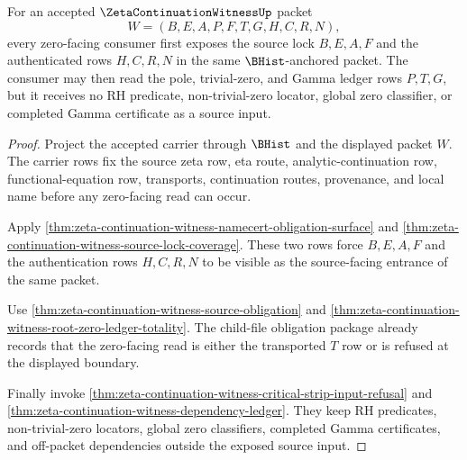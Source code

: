 \begin{theorem}
\label{thm:zeta-continuation-witness-zero-consumer-source-readiness}
For an accepted $\ZetaContinuationWitnessUp$ packet
$$
W=(B,E,A,P,F,T,G,H,C,R,N),
$$
every zero-facing consumer first exposes the source lock $B,E,A,F$ and the authenticated rows $H,C,R,N$ in the same $\BHist$-anchored packet. The consumer may then read the pole, trivial-zero, and Gamma ledger rows $P,T,G$, but it receives no RH predicate, non-trivial-zero locator, global zero classifier, or completed Gamma certificate as a source input.
\end{theorem}
\begin{proof}
Project the accepted carrier through $\BHist$ and the displayed packet $W$. The carrier rows fix the source zeta row, eta route, analytic-continuation row, functional-equation row, transports, continuation routes, provenance, and local name before any zero-facing read can occur.

Apply \autoref{thm:zeta-continuation-witness-namecert-obligation-surface} and \autoref{thm:zeta-continuation-witness-source-lock-coverage}. These two rows force $B,E,A,F$ and the authentication rows $H,C,R,N$ to be visible as the source-facing entrance of the same packet.

Use \autoref{thm:zeta-continuation-witness-source-obligation} and \autoref{thm:zeta-continuation-witness-root-zero-ledger-totality}. The child-file obligation package already records that the zero-facing read is either the transported $T$ row or is refused at the displayed boundary.

Finally invoke \autoref{thm:zeta-continuation-witness-critical-strip-input-refusal} and \autoref{thm:zeta-continuation-witness-dependency-ledger}. They keep RH predicates, non-trivial-zero locators, global zero classifiers, completed Gamma certificates, and off-packet dependencies outside the exposed source input.
\end{proof}

